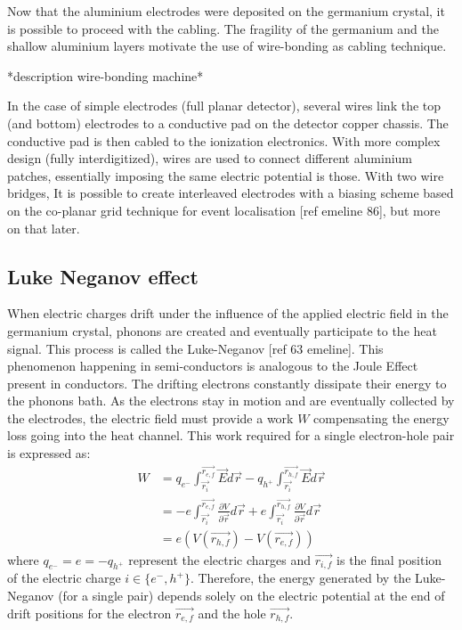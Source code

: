 Now that the aluminium electrodes were deposited on the germanium crystal, it is possible to proceed with the cabling. The fragility of the germanium and the shallow aluminium layers motivate the use of wire-bonding as cabling technique. 

*description wire-bonding machine*

In the case of simple electrodes (full planar detector), several wires link the top (and bottom) electrodes to a conductive pad on the detector copper chassis. The conductive pad is then cabled to the ionization electronics.
With more complex design (fully interdigitized), wires are used to connect different aluminium patches, essentially imposing the same electric potential is those. With two wire bridges, It is possible to create interleaved electrodes with a biasing scheme based on the co-planar grid technique for event localisation [ref emeline 86], but more on that later.


\subsection{Luke Neganov effect}

When electric charges drift under the influence of the applied electric field in the germanium crystal, phonons are created and eventually participate to the heat signal. This process is called the Luke-Neganov [ref 63 emeline]. This phenomenon happening in semi-conductors is analogous to the Joule Effect present in conductors. 
The drifting electrons constantly dissipate their energy to the phonons bath. As the electrons stay in motion and are eventually collected by the electrodes, the electric field must provide a work $W$ compensating the energy loss going into the heat channel.
This work required for a single electron-hole pair is expressed as:
\begin{align}
W &= q_{e^{-}} \int_{ \vec{r_i} }^{ \vec{r_{e,f}} } \vec{E} d\vec{r} - q_{h^{+}} \int_{ \vec{r_i} }^{ \vec{r_{h,f}} } \vec{E} d\vec{r} \\
&=  -e \int_{ \vec{r_i} }^{ \vec{r_{e,f}} } \frac{\partial V}{\partial \vec{r}} d\vec{r} + e \int_{ \vec{r_i} }^{ \vec{r_{h,f}} } \frac{\partial V}{\partial \vec{r}} d\vec{r} \\
&= e \left( V(\vec{r_{h,f}}) - V(\vec{r_{e,f}}) \right)
\end{align}
where $q_{e^{-}} = e = - q_{h^{+}} $ represent the electric charges and $\vec{r_{i,f}}$ is the final position of the electric charge $i \in \{e^{-}, h^{+}\}$. Therefore, the energy generated by the Luke-Neganov (for a single pair) depends solely on the electric potential at the end of drift positions for the electron $\vec{r_{e,f}}$ and the hole $\vec{r_{h,f}}$.


